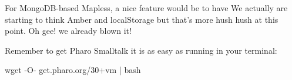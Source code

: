 \documentclass[a4paper,10pt,twoside]{book}
\begin{document}
For MongoDB-based Mapless, a nice feature would be to have 
We actually are starting to think Amber and localStorage but that's more hush hush at this point. Oh gee! we already blown it!

Remember to get Pharo Smalltalk it is as easy as running in your terminal:


\begin{code}{}
wget -O- get.pharo.org/30+vm | bash
\end{code}




\ifx\wholebook\relax\else
   
\end{document}
